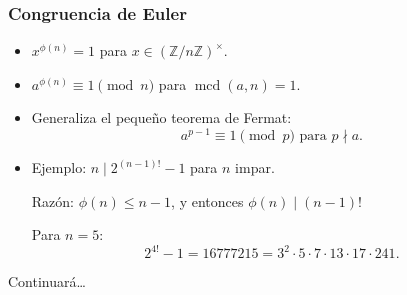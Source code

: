 \documentclass[handout]{beamer}
\newcommand{\ZZ}{\mathbb{Z}}
\DeclareMathOperator{\mcd}{mcd}
\begin{document}
\begin{frame}
  \frametitle{Congruencia de Euler}

  \begin{itemize}
  \item<2-> $x^{\phi(n)} = 1$ para $x \in (\ZZ/n\ZZ)^\times$.

  \item<3-> $a^{\phi (n)} \equiv 1 \pmod{n}$ para $\mcd (a,n) = 1$.

  \item<4-> Generaliza el pequeño teorema de Fermat:
    $$a^{p-1} \equiv 1 \pmod{p} \text{ para } p\nmid a.$$

  \item<5-> Ejemplo: $n \mid 2^{(n-1)!}-1$ para $n$ impar.

    Razón: $\phi (n) \le n-1$, y entonces $\phi (n) \mid (n-1)!$

    Para $n = 5$:
    \[ 2^{4!} - 1 = 16777215 = 3^2 \cdot 5 \cdot 7 \cdot 13 \cdot 17 \cdot 241. \]
  \end{itemize}
\end{frame}


\begin{frame}[plain]
  \headingfont

  \begin{center}
    {\huge Continuará\dots}
  \end{center}
\end{frame}
\end{document}
